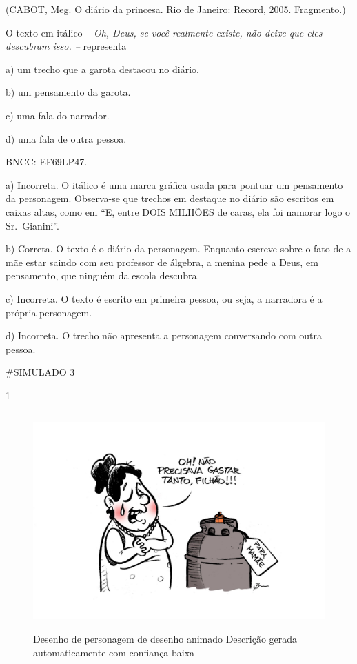(CABOT, Meg. O diário da princesa. Rio de Janeiro: Record, 2005.
Fragmento.)

O texto em itálico -- \emph{Oh, Deus, se você realmente existe, não
deixe que eles descubram isso. --} representa

a) um trecho que a garota destacou no diário.

b) um pensamento da garota.

c) uma fala do narrador.

d) uma fala de outra pessoa.

BNCC: EF69LP47.

a) Incorreta. O itálico é uma marca gráfica usada para pontuar um
pensamento da personagem. Observa-se que trechos em destaque no diário
são escritos em caixas altas, como em ``E, entre DOIS MILHÕES de caras,
ela foi namorar logo o Sr.~Gianini''.

b) Correta. O texto é o diário da personagem. Enquanto escreve sobre o
fato de a mãe estar saindo com seu professor de álgebra, a menina pede a
Deus, em pensamento, que ninguém da escola descubra.

c) Incorreta. O texto é escrito em primeira pessoa, ou seja, a narradora
é a própria personagem.

d) Incorreta. O trecho não apresenta a personagem conversando com outra
pessoa.

\#SIMULADO 3

\num{1}

\begin{figure}
\centering
\includegraphics[width=4.86098in,height=3.28333in]{./imgSAEB_6_POR/media/image39.png}
\caption{Desenho de personagem de desenho animado Descrição gerada
automaticamente com confiança baixa}
\end{figure}

